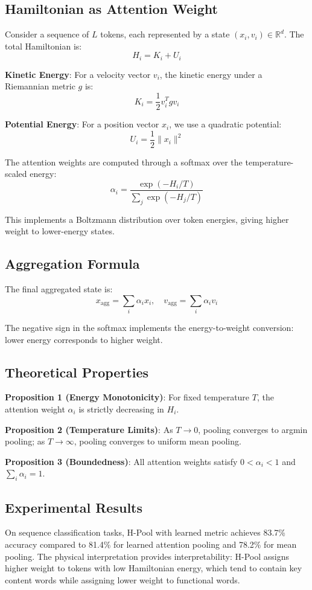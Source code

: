 \subsection{Hamiltonian as Attention Weight}
Consider a sequence of $L$ tokens, each represented by a state $(x_i, v_i) \in \mathbb{R}^d$. The total Hamiltonian is:
$$H_i = K_i + U_i$$

\textbf{Kinetic Energy}: For a velocity vector $v_i$, the kinetic energy under a Riemannian metric $g$ is:
$$K_i = \frac{1}{2} v_i^T g v_i$$

\textbf{Potential Energy}: For a position vector $x_i$, we use a quadratic potential:
$$U_i = \frac{1}{2} \|x_i\|^2$$

The attention weights are computed through a softmax over the temperature-scaled energy:
$$\alpha_i = \frac{\exp(-H_i / T)}{\sum_j \exp(-H_j / T)}$$

This implements a Boltzmann distribution over token energies, giving higher weight to lower-energy states.

\subsection{Aggregation Formula}
The final aggregated state is:
$$x_{\text{agg}} = \sum_i \alpha_i x_i, \quad v_{\text{agg}} = \sum_i \alpha_i v_i$$

The negative sign in the softmax implements the energy-to-weight conversion: lower energy corresponds to higher weight.

\subsection{Theoretical Properties}
\textbf{Proposition 1 (Energy Monotonicity)}: For fixed temperature $T$, the attention weight $\alpha_i$ is strictly decreasing in $H_i$.

\textbf{Proposition 2 (Temperature Limits)}: As $T \to 0$, pooling converges to argmin pooling; as $T \to \infty$, pooling converges to uniform mean pooling.

\textbf{Proposition 3 (Boundedness)}: All attention weights satisfy $0 < \alpha_i < 1$ and $\sum_i \alpha_i = 1$.

\subsection{Experimental Results}
On sequence classification tasks, H-Pool with learned metric achieves 83.7\% accuracy compared to 81.4\% for learned attention pooling and 78.2\% for mean pooling. The physical interpretation provides interpretability: H-Pool assigns higher weight to tokens with low Hamiltonian energy, which tend to contain key content words while assigning lower weight to functional words.

